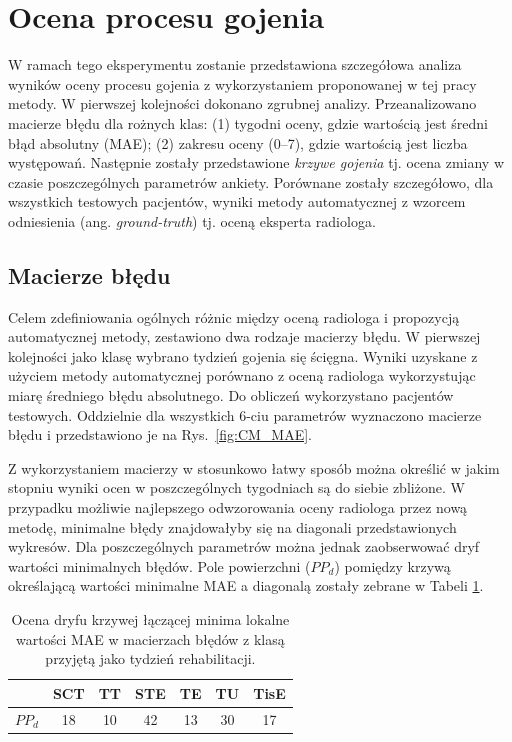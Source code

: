\section{Ocena procesu gojenia}
\label{seq:valuation}
W ramach tego eksperymentu zostanie przedstawiona szczegółowa analiza wyników oceny procesu gojenia z wykorzystaniem proponowanej w tej pracy metody. \linebreak W pierwszej kolejności dokonano zgrubnej analizy. Przeanalizowano macierze błędu dla rożnych klas: (1) tygodni oceny, gdzie wartością jest średni błąd absolutny (MAE); (2) zakresu oceny (0--7), gdzie wartością jest liczba występowań. Następnie zostały przedstawione \textit{krzywe gojenia} tj. ocena zmiany w czasie poszczególnych parametrów ankiety. Porównane zostały szczegółowo, dla wszystkich testowych pacjentów, wyniki metody automatycznej z wzorcem odniesienia (ang. \textit{ground-truth}) tj. oceną eksperta radiologa.

\subsection{Macierze błędu}

Celem zdefiniowania ogólnych różnic między oceną radiologa i propozycją automatycznej metody, zestawiono dwa rodzaje macierzy błędu. W pierwszej kolejności jako klasę wybrano tydzień gojenia się ścięgna. Wyniki uzyskane z użyciem metody automatycznej porównano z oceną radiologa wykorzystując miarę średniego błędu absolutnego. Do obliczeń wykorzystano pacjentów testowych. Oddzielnie dla wszystkich 6-ciu parametrów wyznaczono macierze błędu i przedstawiono je na Rys.~\ref{fig:CM_MAE}. 

Z wykorzystaniem macierzy w stosunkowo łatwy sposób można określić w jakim stopniu wyniki ocen w poszczególnych tygodniach są do siebie zbliżone. \linebreak W przypadku możliwie najlepszego odwzorowania oceny radiologa przez nową metodę, minimalne błędy znajdowałyby się na diagonali przedstawionych wykresów. Dla poszczególnych parametrów można jednak zaobserwować dryf wartości minimalnych błędów. Pole powierzchni ($PP_d$) pomiędzy krzywą określającą wartości minimalne MAE a diagonalą zostały zebrane w Tabeli \ref{tab:dryf_meas}.
\vspace{10px} 
\begin{table}[h!]
	\caption{Ocena dryfu krzywej łączącej minima lokalne wartości MAE w macierzach błędów z klasą przyjętą jako tydzień rehabilitacji.}
	\begin{center}
		\begin{tabular}{l||c|c|c|c|c|c}
		
			& \textbf{SCT} & \textbf{TT} & \textbf{STE} & \textbf{TE} & \textbf{TU} & \textbf{TisE}\\ 
			\hline \hline
			$PP_d$ &18&10&42&13&30&17\\	
					
		\end{tabular}
	\end{center}
	\label{tab:dryf_meas}
\end{table}

